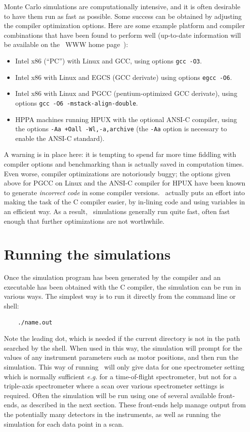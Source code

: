 Monte Carlo simulations are computationally intensive, and it is
often desirable to have them run as fast as possible. Some success can
be obtained by adjusting the compiler optimization
options. Here are some example platform and compiler combinations that
have been found to perform well (up-to-date information will be
available on the \MCS\ WWW home page~\cite{mcstas_webpage}):
\begin{itemize}
\item Intel x86 (``PC'') with Linux and GCC, using options \verb+gcc -O3+.
\item Intel x86 with Linux and EGCS (GCC derivate) using
  options \verb+egcc -O6+.
\item Intel x86 with Linux and PGCC (pentium-optimized GCC derivate), using
  options \verb+gcc -O6 -mstack-align-double+.
\item HPPA machines running HPUX with the optional ANSI-C compiler,
  using the options
  \verb|-Aa +Oall -Wl,-a,archive| (the \verb+-Aa+ option is necessary to
  enable the ANSI-C standard).
\end{itemize}
A warning is in place here: it is tempting to spend far more time
fiddling with compiler options and benchmarking than is actually saved
in computation times. Even worse, compiler optimizations are notoriously
buggy; the options given above for PGCC on Linux and the ANSI-C compiler
for HPUX have been known to generate \emph{incorrect code} in some
compiler versions. \MCS\ actually puts an effort into making the task of the C compiler
easier, by in-lining code and using variables in an efficient way. As a
result, \MCS\ simulations generally run quite fast, often fast enough
that further optimizations are not worthwhile.



\section{Running the simulations}
\label{s:run-sim}

Once the simulation program has been generated by the \MCS{} compiler
and an executable has been obtained with the C compiler, the simulation
can be run in various ways. The simplest way is to run it directly from the
command line or shell:
\begin{verbatim}
    ./name.out
\end{verbatim}
Note the leading dot, which is needed if the current directory is not in
the path searched by the shell. When used in this way, the simulation
will prompt for the values of any instrument parameters such as motor
positions, and then run the simulation.  
This way of running \MCS\ will only give data for one spectrometer
setting which is normally sufficient {\em e.g.} for a time-of-flight
spectrometer, but not for a triple-axis spectrometer where a scan over
various spectrometer settings is required.
Often the simulation will be run using one of several
available front-ends, as described in the next section. These front-ends
help manage output from the potentially many detectors in the
instruments, as well as running the simulation for each data point in
a scan.

